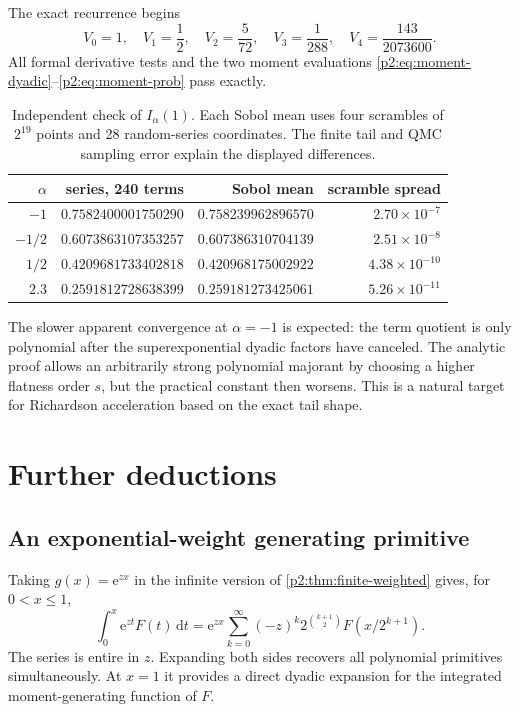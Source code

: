 \documentclass[11pt,oneside]{article}
\theoremstyle{definition}
\theoremstyle{remark}
\newcommand{\dd}{\,\mathrm d}
\newcommand{\e}{\mathrm e}
\newcommand{\1}{\mathbf 1}
\begin{document}
The exact recurrence begins
\begin{equation}
 V_0=1,\quad V_1=\frac12,\quad V_2=\frac5{72},\quad
 V_3=\frac1{288},\quad V_4=\frac{143}{2073600}.            \label{p2:eq:V-first}
\end{equation}
All formal derivative tests and the two moment evaluations
\eqref{p2:eq:moment-dyadic}--\eqref{p2:eq:moment-prob} pass exactly.

\begin{table}[ht]
\centering
\small
\begin{tabular}{@{}rrrr@{}}
\toprule
$\alpha$ & series, 240 terms & Sobol mean & scramble spread \\
\midrule
$-1$   & $0.7582400001750290$ & $0.758239962896570$ & $2.70\times10^{-7}$\\
$-1/2$ & $0.6073863107353257$ & $0.607386310704139$ & $2.51\times10^{-8}$\\
$1/2$  & $0.4209681733402818$ & $0.420968175002922$ & $4.38\times10^{-10}$\\
$2.3$  & $0.2591812728638399$ & $0.259181273425061$ & $5.26\times10^{-11}$\\
\bottomrule
\end{tabular}
\caption{Independent check of $I_\alpha(1)$.  Each Sobol mean uses four
scrambles of $2^{19}$ points and 28 random-series coordinates.  The finite tail
and QMC sampling error explain the displayed differences.}
\label{p2:tab:numerics}
\end{table}

The slower apparent convergence at $\alpha=-1$ is expected: the term quotient
is only polynomial after the superexponential dyadic factors have canceled.
The analytic proof allows an arbitrarily strong polynomial majorant by choosing
a higher flatness order $s$, but the practical constant then worsens.  This is
a natural target for Richardson acceleration based on the exact tail shape.

\section{Further deductions}
\label{p2:sec:further}

\subsection{An exponential-weight generating primitive}
Taking $g(x)=\e^{zx}$ in the infinite version of
\cref{p2:thm:finite-weighted} gives, for $0<x\le1$,
\begin{equation}
 \int_0^x\e^{zt}F(t)\dd t
 =\e^{zx}\sum_{k=0}^{\infty}(-z)^k
 2^{\binom{k+1}{2}}F(x/2^{k+1}).                          \label{p2:eq:exponential-primitive}
\end{equation}
The series is entire in $z$.  Expanding both sides recovers all polynomial
primitives simultaneously.  At $x=1$ it provides a direct dyadic expansion for
the integrated moment-generating function of $F$.
\end{document}
